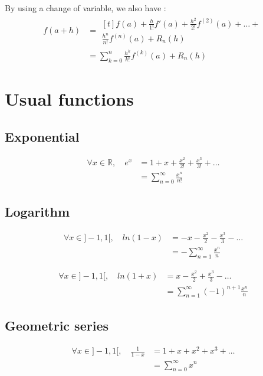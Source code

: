 \documentclass[hidelinks]{article}
\newenvironment{nalign}{
    \begin{equation}
    \begin{aligned}
}{
    \end{aligned}
    \end{equation}
    \ignorespacesafterend
}
\begin{document}
	By using a change of variable, we also have :
	\begin{nalign}
     f(a+h) &= \begin{multlined}[t]f(a) + \frac{h}{1!}f'(a)+\frac{h^2}{2!}f^{(2)}(a)+\dots+ \\ 
    \frac{h^n}{n!}f^{(n)}(a)+R_{n}(h) \end{multlined} \\
    &= \sum_{k=0}^{n} \frac{h^k}{k!}f^{(k)}(a)+R_{n}(h)
    \end{nalign}
    \newpage
    \section{Usual functions}
    
    \subsection{Exponential}
    
    \begin{nalign}
    \forall x \in \mathbb{R}, \quad e^x &= 1 + x + \frac{x^2}{2!} + \frac{x^3}{3!} + \dots \\
    &= \sum_{n=0}^{\infty}\frac{x^n}{n!}
    \end{nalign}
    
    \subsection{Logarithm}
    
    
    
     \begin{nalign}
    \forall x \in ]-1,1[, \quad ln(1-x) &= - x - \frac{x^2}{2} - \frac{x^3}{3} - \dots \\
    &=- \sum_{n=1}^{\infty}\frac{x^n}{n}
    \end{nalign}
    
     \begin{nalign}
    \forall x \in ]-1,1[, \quad ln(1+x) &= x - \frac{x^2}{2} + \frac{x^3}{3} - \dots \\
    &=\sum_{n=1}^{\infty}(-1)^{n+1}\frac{x^n}{n}
    \end{nalign}
    
    
    \subsection{Geometric series}
    
    \begin{nalign}
    \forall x \in ]-1,1[, \quad \frac{1}{1-x} &= 1 + x + x^2 + x^3 + \dots \\
    &=\sum_{n=0}^{\infty}x^n
    \end{nalign}
    
\end{document}
